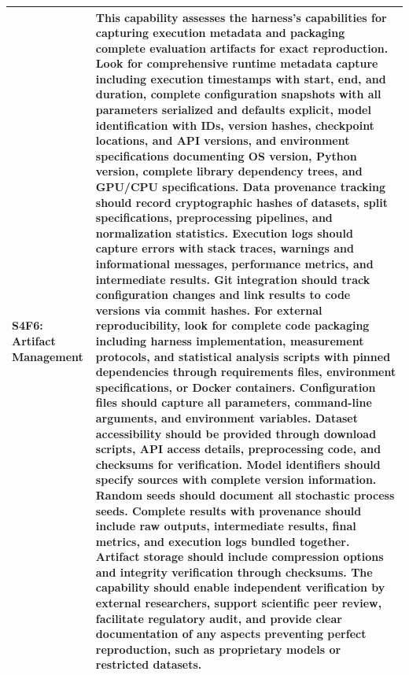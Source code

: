 \begin{longtable}{>{\raggedright\arraybackslash}p{3cm}|>{\raggedright\arraybackslash}p{16cm}}
S4F6: Artifact Management & This capability assesses the harness's capabilities for capturing execution metadata and packaging complete evaluation artifacts for exact reproduction. Look for comprehensive runtime metadata capture including execution timestamps with start, end, and duration, complete configuration snapshots with all parameters serialized and defaults explicit, model identification with IDs, version hashes, checkpoint locations, and API versions, and environment specifications documenting OS version, Python version, complete library dependency trees, and GPU/CPU specifications. Data provenance tracking should record cryptographic hashes of datasets, split specifications, preprocessing pipelines, and normalization statistics. Execution logs should capture errors with stack traces, warnings and informational messages, performance metrics, and intermediate results. Git integration should track configuration changes and link results to code versions via commit hashes. For external reproducibility, look for complete code packaging including harness implementation, measurement protocols, and statistical analysis scripts with pinned dependencies through requirements files, environment specifications, or Docker containers. Configuration files should capture all parameters, command-line arguments, and environment variables. Dataset accessibility should be provided through download scripts, API access details, preprocessing code, and checksums for verification. Model identifiers should specify sources with complete version information. Random seeds should document all stochastic process seeds. Complete results with provenance should include raw outputs, intermediate results, final metrics, and execution logs bundled together. Artifact storage should include compression options and integrity verification through checksums. The capability should enable independent verification by external researchers, support scientific peer review, facilitate regulatory audit, and provide clear documentation of any aspects preventing perfect reproduction, such as proprietary models or restricted datasets. \\
\hline

\end{longtable}
\restoregeometry